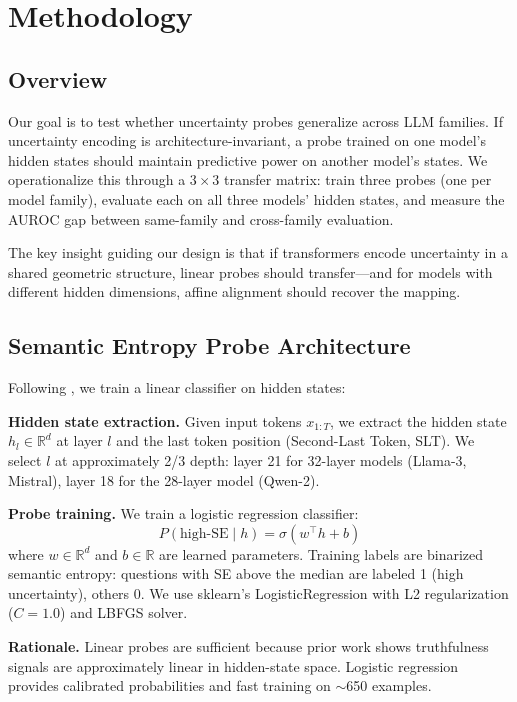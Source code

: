 \section{Methodology}

\subsection{Overview}

Our goal is to test whether uncertainty probes generalize across LLM families. If uncertainty encoding is architecture-invariant, a probe trained on one model's hidden states should maintain predictive power on another model's states. We operationalize this through a $3 \times 3$ transfer matrix: train three probes (one per model family), evaluate each on all three models' hidden states, and measure the AUROC gap between same-family and cross-family evaluation.

The key insight guiding our design is that if transformers encode uncertainty in a shared geometric structure, linear probes should transfer---and for models with different hidden dimensions, affine alignment should recover the mapping.

\subsection{Semantic Entropy Probe Architecture}

Following \citet{kossen2024semantic}, we train a linear classifier on hidden states:

\textbf{Hidden state extraction.} Given input tokens $x_{1:T}$, we extract the hidden state $h_l \in \mathbb{R}^d$ at layer $l$ and the last token position (Second-Last Token, SLT). We select $l$ at approximately 2/3 depth: layer 21 for 32-layer models (Llama-3, Mistral), layer 18 for the 28-layer model (Qwen-2).

\textbf{Probe training.} We train a logistic regression classifier:
\begin{equation}
P(\text{high-SE} \mid h) = \sigma(w^\top h + b)
\end{equation}
where $w \in \mathbb{R}^d$ and $b \in \mathbb{R}$ are learned parameters. Training labels are binarized semantic entropy: questions with SE above the median are labeled 1 (high uncertainty), others 0. We use sklearn's LogisticRegression with L2 regularization ($C=1.0$) and LBFGS solver.

\textbf{Rationale.} Linear probes are sufficient because prior work shows truthfulness signals are approximately linear in hidden-state space. Logistic regression provides calibrated probabilities and fast training on $\sim$650 examples.


